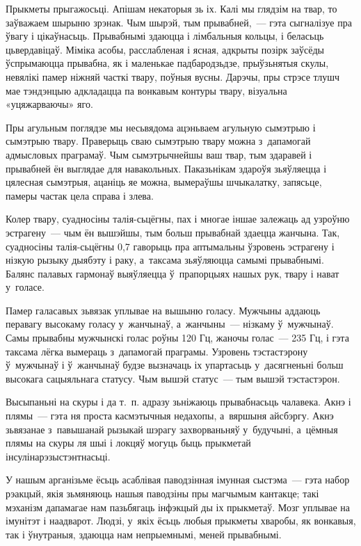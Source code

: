 Прыкметы прыгажосьці. Апішам некаторыя зь іх. Калі мы глядзім на твар, то заўважаем шырыню зрэнак. Чым шырэй, тым прывабней,~--- гэта сыгналізуе пра ўвагу і цікаўнасьць. Прывабнымі здаюцца і лімбальныя кольцы, і беласьць цьвердавіцаў. Міміка асобы, расслабленая і ясная, адкрыты позірк заўсёды ўспрымаюцца прывабна, як і маленькае падбародзьдзе, прыўзьнятыя скулы, невялікі памер ніжняй часткі твару, поўныя вусны. Дарэчы, пры стрэсе тлушч мае тэндэнцыю адкладацца па вонкавым контуры твару, візуальна «уцяжарваючы» яго.

Пры агульным поглядзе мы несьвядома ацэньваем агульную сымэтрыю і сымэтрыю твару. Праверыць сваю сымэтрыю твару можна з~дапамогай адмысловых праграмаў. Чым сымэтрычнейшы ваш твар, тым здаравей і прывабней ён выглядае для навакольных. Паказьнікам здароўя зьяўляецца і цялесная сымэтрыя, ацаніць яе можна, вымераўшы шчыкалатку, запясьце, памеры частак цела справа і злева.

Колер твару, суадносіны талія-сьцёгны, пах і многае іншае залежаць ад узроўню эстрагену~--- чым ён вышэйшы, тым больш прывабнай здаецца жанчына. Так, суадносіны талія-сьцёгны 0,7 гаворыць пра аптымальны ўзровень эстрагену і нізкую рызыку дыябэту і раку, а~таксама зьяўляюцца самымі прывабнымі. Балянс палавых гармонаў выяўляецца ў~прапорцыях нашых рук, твару і нават у~голасе.

Памер галасавых зьвязак уплывае на вышыню голасу. Мужчыны аддаюць перавагу высокаму голасу у~жанчынаў, а~жанчыны~--- нізкаму ў~мужчынаў. Самы прывабны мужчынскі голас роўны 120 Гц, жаночы голас~--- 235 Гц, і гэта таксама лёгка вымераць з~дапамогай праграмы. Узровень тэстастэрону ў~мужчынаў і ў~жанчынаў будзе вызначаць іх упартасьць у~дасягненьні больш высокага сацыяльнага статусу. Чым вышэй статус~--- тым вышэй тэстастэрон.

Высыпаньні на скуры і да т.~п. адразу зьніжаюць прывабнасьць чалавека. Акнэ і плямы~--- гэта ня проста касмэтычныя недахопы, а~вяршыня айсбэргу. Акнэ зьвязанае з~павышанай рызыкай шэрагу захворваньняў у~будучыні, а~цёмныя плямы на скуры ля шыі і локцяў могуць быць прыкметай інсулінарэзыстэнтнасьці.

У нашым арганізьме ёсьць асаблівая паводзінная імунная сыстэма~--- гэта набор рэакцый, якія зьмяняюць нашыя паводзіны пры магчымым кантакце; такі мэханізм дапамагае нам пазьбягаць інфэкцый ды іх прыкметаў. Мозг уплывае на імунітэт і наадварот. Людзі, у~якіх ёсьць любыя прыкметы хваробы, як вонкавыя, так і ўнутраныя, здаюцца нам непрыемнымі, меней прывабнымі.

